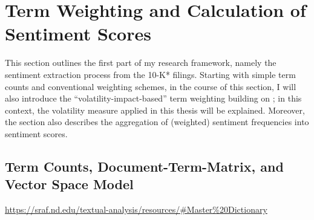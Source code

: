 \section{Term Weighting and Calculation of Sentiment Scores}
\label{sec: sentiment_calcs}
This section outlines the first part of my research framework, namely the sentiment extraction process from the 10-K* filings. Starting with simple term counts and conventional weighting schemes, in the course of this section, I will also introduce the \enquote{volatility-impact-based} term weighting building on \textcite{Jegadeesh2013}; in this context, the volatility measure applied in this thesis will be explained. Moreover, the section also describes the aggregation of (weighted) sentiment frequencies into sentiment scores.


\subsection{Term Counts, Document-Term-Matrix, and Vector Space Model}
\label{ssec: senti_counts}
\urldef\myurl\url{https://sraf.nd.edu/textual-analysis/resources/#Master%20Dictionary}

